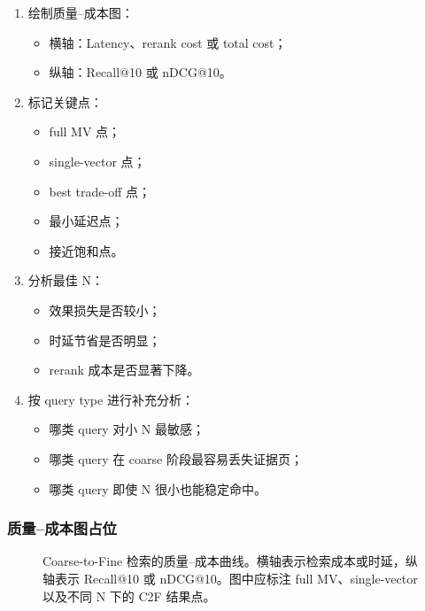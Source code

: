 \documentclass[UTF8,a4paper,12pt]{ctexart}
\begin{document}
	\begin{enumerate}[leftmargin=2em]
		\item 绘制质量--成本图：
		\begin{itemize}
			\item 横轴：Latency、rerank cost 或 total cost；
			\item 纵轴：Recall@10 或 nDCG@10。
		\end{itemize}
		
		\item 标记关键点：
		\begin{itemize}
			\item full MV 点；
			\item single-vector 点；
			\item best trade-off 点；
			\item 最小延迟点；
			\item 接近饱和点。
		\end{itemize}
		
		\item 分析最佳 N：
		\begin{itemize}
			\item 效果损失是否较小；
			\item 时延节省是否明显；
			\item rerank 成本是否显著下降。
		\end{itemize}
		
		\item 按 query type 进行补充分析：
		\begin{itemize}
			\item 哪类 query 对小 N 最敏感；
			\item 哪类 query 在 coarse 阶段最容易丢失证据页；
			\item 哪类 query 即使 N 很小也能稳定命中。
		\end{itemize}
	\end{enumerate}
	
	\subsubsection*{质量--成本图占位}
	
	\begin{figure}[H]
		\centering
		\caption{Coarse-to-Fine 检索的质量--成本曲线。横轴表示检索成本或时延，纵轴表示 Recall@10 或 nDCG@10。图中应标注 full MV、single-vector 以及不同 N 下的 C2F 结果点。}
		\label{fig:quality_cost_curve}
	\end{figure}
	
\end{document}
